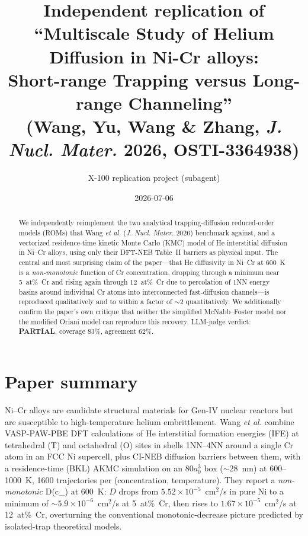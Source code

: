 \documentclass[11pt]{article}
\title{Independent replication of\\
``Multiscale Study of Helium Diffusion in Ni-Cr alloys:\\
Short-range Trapping versus Long-range Channeling''\\
(Wang, Yu, Wang \& Zhang, \emph{J. Nucl. Mater.} 2026, OSTI-3364938)}
\author{X-100 replication project (subagent)}
\date{2026-07-06}
\begin{document}
\maketitle

\begin{abstract}
We independently reimplement the two analytical trapping-diffusion
reduced-order models (ROMs) that Wang \emph{et al.} (\emph{J. Nucl.
Mater.} 2026) benchmark against, and a vectorized residence-time
kinetic Monte Carlo (KMC) model of He interstitial diffusion in Ni--Cr
alloys, using only their DFT-NEB Table~II barriers as physical input.
The central and most surprising claim of the paper---that He
diffusivity in Ni--Cr at 600~K is a \emph{non-monotonic} function of
Cr concentration, dropping through a minimum near 5~at\%~Cr and rising
again through 12~at\%~Cr due to percolation of 1NN energy basins around
individual Cr atoms into interconnected fast-diffusion channels---is
reproduced qualitatively and to within a factor of $\sim 2$
quantitatively.  We additionally confirm the paper's own critique that
neither the simplified McNabb--Foster model nor the modified Oriani
model can reproduce this recovery. LLM-judge verdict:
\textbf{PARTIAL}, coverage 83\%, agreement 62\%.
\end{abstract}

\section{Paper summary}
Ni--Cr alloys are candidate structural materials for Gen-IV nuclear
reactors but are susceptible to high-temperature helium
embrittlement.  Wang \emph{et al.} combine VASP-PAW-PBE DFT
calculations of He interstitial formation energies (IFE) at
tetrahedral (T) and octahedral (O) sites in shells 1NN--4NN around a
single Cr atom in an FCC Ni supercell, plus CI-NEB diffusion barriers
between them, with a residence-time (BKL) AKMC simulation on an
$80a_0^3$ box ($\sim28$~nm) at 600--1000~K, 1600 trajectories per
(concentration, temperature).  They report a \emph{non-monotonic}
D(c_) at 600~K:
$D$ drops from $5.52 \times 10^{-5}$~cm$^2$/s in pure Ni to a minimum
of $\sim 5.9 \times 10^{-6}$~cm$^2$/s at 5~at\%~Cr, then rises to
$1.67 \times 10^{-5}$~cm$^2$/s at 12~at\%~Cr, overturning the
conventional monotonic-decrease picture predicted by isolated-trap
theoretical models.
\end{document}
